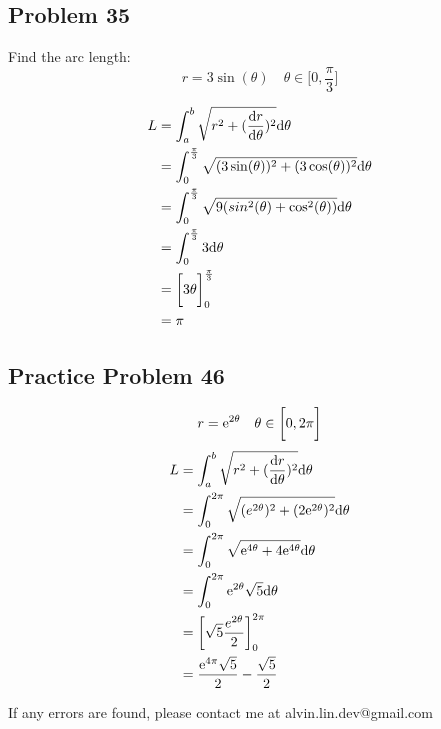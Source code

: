 \documentclass[letterpaper, 12pt]{math}
\begin{document}
\subsection*{Problem 35}
Find the arc length:
\[ r = 3\sin(\theta) \quad \theta\in\bigg[0,\frac{\pi}{3}\bigg] \]
\begin{center}
\end{center}
\begin{align*}
  L &= \int_{a}^{b}{\sqrt{r^{2}+(\frac{\mathrm{d}{r}}{\mathrm{d}{\theta}})^{2}}\mathrm{d}{\theta}} \\
  &= \int_{0}^{\frac{\pi}{3}}
    {\sqrt{(3\sin(\theta))^{2}+(3\cos(\theta))^{2}}\mathrm{d}{\theta}} \\
  &= \int_{0}^{\frac{\pi}{3}}
    {\sqrt{9(sin^{2}(\theta)+\cos^{2}(\theta))}\mathrm{d}{\theta}} \\
  &= \int_{0}^{\frac{\pi}{3}}{3\mathrm{d}{\theta}} \\
  &= \bigg[3\theta\bigg]_{0}^{\frac{\pi}{3}} \\
  &= \pi
\end{align*}

\subsection*{Practice Problem 46}
\[ r = \mathrm{e}^{2\theta} \quad \theta\in\bigg[0,2\pi\bigg] \]
\begin{align*}
  L &= \int_{a}^{b}{\sqrt{r^{2}+(\frac{\mathrm{d}{r}}{\mathrm{d}{\theta}})^{2}}\mathrm{d}{\theta}} \\
  &= \int_{0}^{2\pi}
    {\sqrt{(e^{2\theta})^{2}+(2\mathrm{e}^{2\theta})^{2}}\mathrm{d}{\theta}} \\
  &= \int_{0}^{2\pi}{\sqrt{\mathrm{e}^{4\theta}+4\mathrm{e}^{4\theta}}\mathrm{d}{\theta}} \\
  &= \int_{0}^{2\pi}{\mathrm{e}^{2\theta}\sqrt{5}\mathrm{d}{\theta}} \\
  &= \bigg[\sqrt{5}\frac{e^{2\theta}}{2}\bigg]_{0}^{2\pi} \\
  &= \frac{\mathrm{e}^{4\pi}\sqrt{5}}{2}-\frac{\sqrt{5}}{2}
\end{align*}

\begin{center}
  If any errors are found, please contact me at alvin.lin.dev@gmail.com
\end{center}
\end{document}
